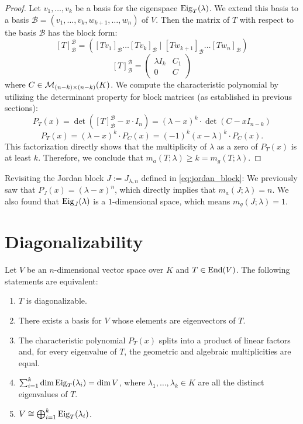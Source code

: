 \begin{proof}
  Let $v_1, \dots, v_k$ be a basis for the eigenspace $\operatorname{Eig}_T(\lambda)$. We extend this basis to a basis $\mathcal{B} = (v_1, \dots, v_k, w_{k+1}, \dots, w_n)$ of $V$.
  Then the matrix of $T$ with respect to the basis $\mathcal{B}$ has the block form:
  \[ [T]_{\mathcal{B}}^{\mathcal{B}} = \left( [Tv_1]_{\mathcal{B}} \dots [Tv_k]_{\mathcal{B}} \mid [Tw_{k+1}]_{\mathcal{B}} \dots [Tw_n]_{\mathcal{B}} \right) \]
  \begin{equation} \label{eq:block_matrix_T}
    [T]_{\mathcal{B}}^{\mathcal{B}} = \left(\begin{array}{c|c} \lambda I_k & C_1 \\ \hline 0 & C \end{array}\right)
  \end{equation}
  where $C \in \mathcal{M}_{(n-k) \times (n-k)}(K)$.
  We compute the characteristic polynomial by utilizing the determinant property for block matrices (as established in previous sections):
  \[ P_T(x) = \det([T]_{\mathcal{B}}^{\mathcal{B}} - x \cdot I_n) = (\lambda - x)^k \cdot \det(C - x I_{n-k}) \]
  \[ P_T(x) = (\lambda - x)^k \cdot P_C(x) = (-1)^k(x - \lambda)^k \cdot P_C(x). \]
  This factorization directly shows that the multiplicity of $\lambda$ as a zero of $P_T(x)$ is at least $k$.
  Therefore, we conclude that $m_a(T;\lambda) \ge k = m_g(T;\lambda)$.
\end{proof}

\begin{example}\label{ex:jordan_block_geom_alg}
  Revisiting the Jordan block $J := J_{\lambda, n}$ defined in \eqref{eq:jordan_block}:
  We previously saw that $P_J(x) = (\lambda - x)^n$, which directly implies that $m_a(J;\lambda) = n$.
  We also found that $\operatorname{Eig}_J(\lambda)$ is a $1$-dimensional space, which means $m_g(J;\lambda) = 1$.
\end{example}


\section{Diagonalizability}

\begin{theorem}\label{thm:diag_equiv}
  Let $V$ be an $n$-dimensional vector space over $K$ and $T \in \operatorname{End}(V)$. The following statements are equivalent:
  \begin{enumerate}
    \item $T$ is diagonalizable.
    \item There exists a basis for $V$ whose elements are eigenvectors of $T$.
    \item The characteristic polynomial $P_T(x)$ splits into a product of linear factors and, for every eigenvalue of $T$, the geometric and algebraic multiplicities are equal.
    \item $\sum_{i=1}^k \dim \operatorname{Eig}_T(\lambda_i) = \dim V$, where $\lambda_1, \dots, \lambda_k \in K$ are all the distinct eigenvalues of $T$.
    \item $V \cong \bigoplus_{i=1}^k \operatorname{Eig}_T(\lambda_i)$.
  \end{enumerate}
\end{theorem}

